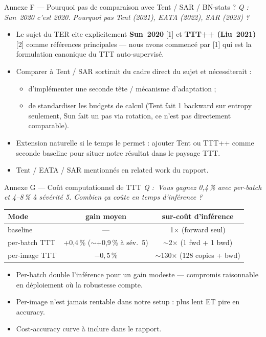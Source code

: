 \documentclass[10pt,aspectratio=169]{beamer}
\newcommand{\qbox}[1]{\textit{\textcolor{accent}{Q : #1}}\par\smallskip}
\begin{document}
\begin{frame}{Annexe F --- Pourquoi pas de comparaison avec Tent / SAR / BN-stats ?}
  \qbox{\guillemotleft\,Sun~2020 c'est 2020. Pourquoi pas Tent (2021), EATA (2022), SAR (2023) ?\,\guillemotright{}}

  \begin{itemize}
    \item Le sujet du TER cite explicitement \textbf{Sun~2020} [1] et \textbf{TTT++ (Liu~2021)} [2] comme références principales --- nous avons commencé par [1] qui est la formulation canonique du TTT auto-supervisé.
    \item Comparer à Tent / SAR sortirait du cadre direct du sujet et nécessiterait :
    \begin{itemize}\small
      \item d'implémenter une seconde tête / mécanisme d'adaptation ;
      \item de standardiser les budgets de calcul (Tent fait 1 backward sur entropy seulement, Sun fait un pas via rotation, ce n'est pas directement comparable).
    \end{itemize}
    \item Extension naturelle si le temps le permet : ajouter Tent ou TTT++ comme seconde baseline pour situer notre résultat dans le paysage TTT.
    \item Tent / EATA / SAR mentionnés en related work du rapport.
  \end{itemize}
\end{frame}

\begin{frame}{Annexe G --- Coût computationnel de TTT}
  \qbox{\guillemotleft\,Vous gagnez 0,4\,\% avec per-batch et 4--8\,\% à sévérité 5. Combien ça coûte en temps d'inférence ?\,\guillemotright{}}

  \centering
  \begin{tabular}{lcc}
    \toprule
    Mode & gain moyen & sur-coût d'inférence \\
    \midrule
    baseline           & --- & 1$\times$ (forward seul) \\
    per-batch TTT      & +0,4\,\% ($\sim$+0,9\,\% à sév.~5) & $\sim$2$\times$ (1 fwd + 1 bwd) \\
    per-image TTT      & $-0{,}5$\,\% & $\sim$130$\times$ (128 copies + bwd) \\
    \bottomrule
  \end{tabular}

  \vspace{0.7em}
  \begin{itemize}\small
    \item Per-batch double l'inférence pour un gain modeste --- compromis raisonnable en déploiement où la robustesse compte.
    \item Per-image \alert{n'est jamais rentable} dans notre setup : plus lent ET pire en accuracy.
    \item Cost-accuracy curve à inclure dans le rapport.
  \end{itemize}
\end{frame}
\end{document}
